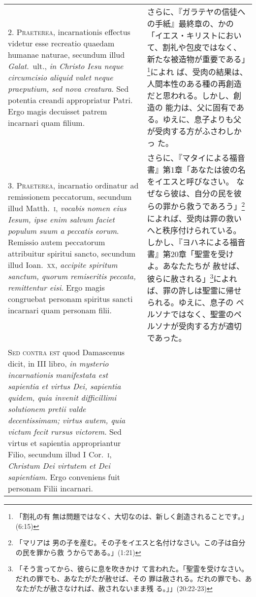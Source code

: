 \documentclass[10pt]{jsarticle} %
\begin{document}
\begin{longtable}{p{21em}p{21em}}
\\



2. {\scshape Praeterea}, incarnationis effectus videtur esse recreatio quaedam humanae
naturae, secundum illud {\itshape Galat}.~ult., {\itshape in Christo Iesu neque circumcisio
aliquid valet neque praeputium, sed nova creatura}. Sed potentia creandi
appropriatur Patri. Ergo magis decuisset patrem incarnari quam filium.

&

さらに、『ガラテヤの信徒への手紙』最終章の、かの「イエス・キリストにおい
 て、割礼や包皮ではなく、新たな被造物が重要である」\footnote{「割礼の有
 無は問題ではなく、大切なのは、新しく創造されることです。」(6:15)}によれ
 ば、受肉の結果は、人間本性のある種の再創造だと思われる。しかし、創造の
 能力は、父に固有である。ゆえに、息子よりも父が受肉する方がふさわしかっ
 た。

\\



3. {\scshape Praeterea}, incarnatio ordinatur ad remissionem peccatorum, secundum
illud Matth.~{\scshape i}, {\itshape vocabis nomen eius Iesum, ipse enim salvum faciet
populum suum a peccatis eorum}. Remissio autem peccatorum attribuitur
spiritui sancto, secundum illud Ioan.~{\scshape xx}, {\itshape accipite spiritum sanctum,
quorum remiseritis peccata, remittentur eisi}. Ergo magis congruebat
personam spiritus sancti incarnari quam personam filii.

&


さらに、『マタイによる福音書』第1章「あなたは彼の名をイエスと呼びなさい。
 なぜなら彼は、自分の民を彼らの罪から救うであろう」\footnote{「マリアは
 男の子を産む。その子をイエスと名付けなさい。この子は自分の民を罪から救
 うからである。」(1:21)}によれば、受肉は罪の救いへと秩序付けられている。
 しかし、『ヨハネによる福音書』第20章「聖霊を受けよ。あなたたちが
 赦せば、彼らに赦される」\footnote{「そう言ってから、彼らに息を吹きかけ
 て言われた。「聖霊を受けなさい。だれの罪でも、あなたがたが赦せば、その
 罪は赦される。だれの罪でも、あなたがたが赦さなければ、赦されないまま残
 る。」」(20:22-23)}によれば、罪の許しは聖霊に帰せられる。ゆえに、息子の
 ペルソナではなく、聖霊のペルソナが受肉する方が適切であった。

\\



{\scshape Sed contra est} quod Damascenus dicit, in III libro, {\itshape in mysterio
incarnationis manifestata est sapientia et virtus Dei, sapientia quidem,
quia invenit difficillimi solutionem pretii valde decentissimam; virtus
autem, quia victum fecit rursus victorem}. Sed virtus et sapientia
appropriantur Filio, secundum illud I Cor.~{\scshape i}, {\itshape Christum Dei virtutem et
Dei sapientiam}. Ergo conveniens fuit personam Filii incarnari.


\end{longtable}
\end{document}
